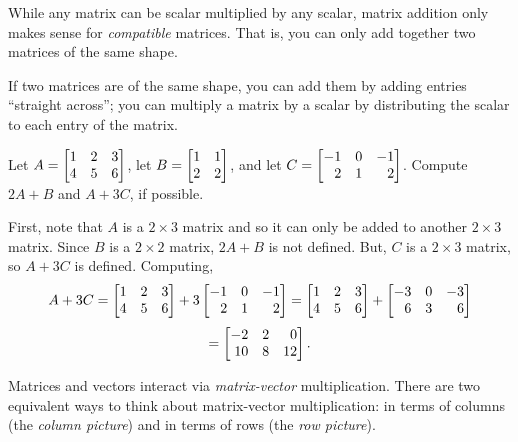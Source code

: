 While any matrix can be scalar multiplied by any scalar, matrix addition only makes sense for \emph{compatible} matrices.
That is, you can only add together two matrices of the same shape.

\begin{emphbox}[Takeaway]
	If two matrices are of the same shape, you can add them by adding entries ``straight across''; you
	can multiply a matrix by a scalar by distributing the scalar to each entry of the matrix.
\end{emphbox}

\begin{example}
	Let $A=\mat{1&2&3\\4&5&6}$, let $B=\mat{1&1\\2&2}$, and let $C=\mat{-1&0&-1\\2&1&2}$.
	Compute $2A+B$ and $A+3C$, if possible.

	First, note that $A$ is a $2\times 3$ matrix and so it can only be added to another $2\times 3$ matrix.
	Since $B$ is a $2\times 2$ matrix, $2A+B$ is not defined. But, $C$ is a $2\times 3$ matrix, so $A+3C$ is defined.
	Computing,
	\[
		A+3C=\mat{1&2&3\\4&5&6} + 3\mat{-1&0&-1\\2&1&2} = \mat{1&2&3\\4&5&6} + \mat{-3&0&-3\\6&3&6}
	\]\[
		= \mat{-2&2&0\\10&8&12}.
	\]
\end{example}

Matrices and vectors interact via \emph{matrix-vector} multiplication. There are two equivalent ways to think about
matrix-vector multiplication: in terms of columns 
(the \emph{column picture}) and in terms of rows (the \emph{row picture}).


